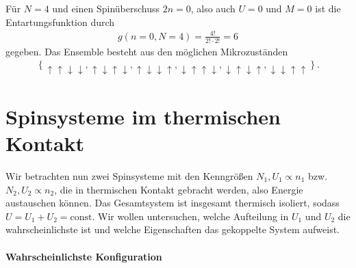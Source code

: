 Für $N=4$ und einen Spinüberschuss $2n=0$, also auch $U=0$ und $M=0$ ist die Entartungsfunktion durch
\begin{align*}
    g(n=0,N=4) = \frac{4!}{2!\cdot 2!} = 6
\end{align*}
gegeben. Das Ensemble besteht aus den möglichen Mikrozuständen
\begin{align*}
    \left\{ \uparrow\uparrow\downarrow\downarrow,\uparrow\downarrow\uparrow\downarrow,\uparrow\downarrow\downarrow\uparrow,\downarrow\uparrow\uparrow\downarrow,\downarrow\uparrow\downarrow\uparrow,\downarrow\downarrow\uparrow\uparrow \right\}.
\end{align*}



\section{Spinsysteme im thermischen Kontakt}

Wir betrachten nun zwei Spinsysteme mit den Kenngrößen $N_1,U_1\propto n_1$ bzw. $N_2,U_2\propto n_2$, die in thermischen Kontakt gebracht werden, also Energie austauschen können. Das Gesamtsystem ist insgesamt thermisch isoliert, sodass $U=U_1+U_2=\mathrm{const}$.
Wir wollen untersuchen, welche Aufteilung in $U_1$ und $U_2$ die wahrscheinlichste ist und welche Eigenschaften das gekoppelte System aufweist.


\paragraph*{Wahrscheinlichste Konfiguration}

